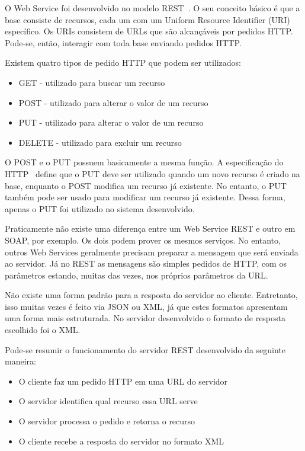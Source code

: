 O Web Service foi desenvolvido no modelo REST~\cite{restful}. O seu conceito básico é que a base consiste de recursos, cada um com um Uniform Resource Identifier (URI)
específico. Os URIs consistem de URLs que são alcançáveis por pedidos HTTP. Pode-se, então, interagir com toda base enviando pedidos HTTP.

Existem quatro tipos de pedido HTTP que podem ser utilizados:

\begin{itemize}
\item GET - utilizado para buscar um recurso
\item POST - utilizado para alterar o valor de um recurso
\item PUT - utilizado para alterar o valor de um recurso
\item DELETE - utilizado para excluir um recurso
\end{itemize}

O POST e o PUT possuem basicamente a mesma função. A especificação do HTTP~\cite{RFC2616} define que o PUT deve ser utilizado quando um novo recurso é criado na base, enquanto o POST modifica um recurso já existente. No entanto, o PUT também pode ser usado para modificar um recurso já existente. Dessa forma, apenas o PUT foi utilizado no sistema desenvolvido.

Praticamente não existe uma diferença entre um Web Service REST e outro em SOAP, por exemplo. Os dois podem prover os mesmos serviços. No entanto, outros Web Services geralmente precisam preparar a mensagem que será enviada ao servidor. Já no REST as mensagens são simples pedidos de HTTP, com os parâmetros estando, muitas das vezes, nos próprios parâmetros da URL.

Não existe uma forma padrão para a resposta do servidor ao cliente. Entretanto, isso muitas vezes é feito via JSON ou XML, já que estes formatos apresentam uma forma mais estruturada. No servidor desenvolvido o formato de resposta escolhido foi o XML.

Pode-se resumir o funcionamento do servidor REST desenvolvido da seguinte maneira:

\begin{itemize}
\item O cliente faz um pedido HTTP em uma URL do servidor
\item O servidor identifica qual recurso essa URL serve
\item O servidor processa o pedido e retorna o recurso
\item O cliente recebe a resposta do servidor no formato XML
\end{itemize}

